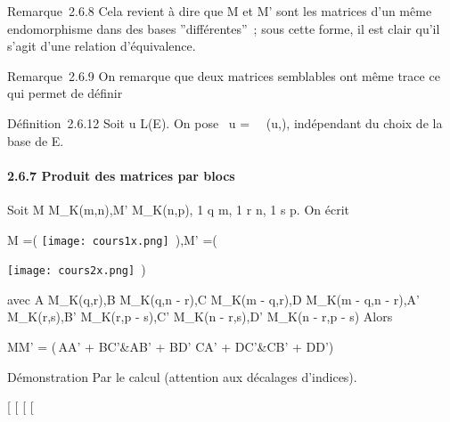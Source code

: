 \documentclass[]{article}
\begin{document}
Remarque~2.6.8 Cela revient à dire que M et M' sont les matrices d'un
même endomorphisme dans des bases ''différentes''~; sous cette forme, il
est clair qu'il s'agit d'une relation d'équivalence.

Remarque~2.6.9 On remarque que deux matrices semblables ont même trace
ce qui permet de définir

Définition~2.6.12 Soit u \in L(E). On pose
~u
=\
\mathrmMat~
(u,), indépendant du choix de la base  de E.

\paragraph{2.6.7 Produit des matrices par blocs}

Soit M \in M_K(m,n),M' \in M_K(n,p), 1 \leq q \leq m, 1 \leq r \leq n,
1 \leq s \leq p. On écrit

M =\left ( \texttt{[image: cours1x.png]}
\,\right ),\quad M'
=\left (

\texttt{[image: cours2x.png]} \,\right )

avec A \in M_K(q,r),B \in M_K(q,n - r),C \in M_K(m
- q,r),D \in M_K(m - q,n - r),A' \in M_K(r,s),B' \in
M_K(r,p - s),C' \in M_K(n - r,s),D' \in M_K(n -
r,p - s) Alors

MM' = \left (\matrix\,AA'
+ BC'&AB' + BD' \cr CA' + DC'&CB' +
DD'\right )

Démonstration Par le calcul (attention aux décalages d'indices).

{[}
{[}
{[}
{[}
\end{document}
